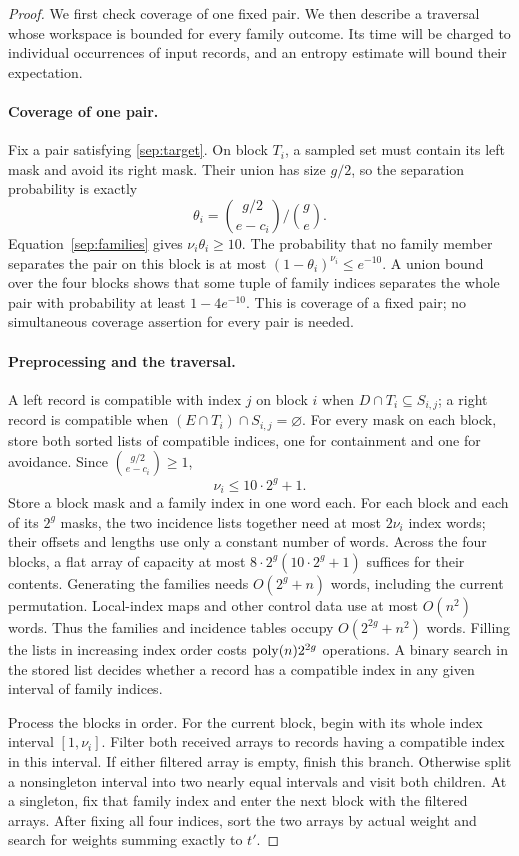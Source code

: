 \begin{proof}
We first check coverage of one fixed pair. We then describe a traversal
whose workspace is bounded for every family outcome. Its time will be
charged to individual occurrences of input records, and an entropy
estimate will bound their expectation.

\paragraph{Coverage of one pair.}
Fix a pair satisfying \eqref{sep:target}. On block $T_i$, a sampled
set must contain its left mask and avoid its right mask. Their union
has size $g/2$, so the separation probability is exactly
\[
 \theta_i=\binom{g/2}{e-c_i}\big/\binom{g}{e}.
\]
Equation~\eqref{sep:families} gives $\nu_i\theta_i\ge10$.
The probability that no family member separates the pair on this
block is at most $(1-\theta_i)^{\nu_i}\le e^{-10}$.
A union bound over the four blocks shows that some tuple of family
indices separates the whole pair with probability at least
$1-4e^{-10}$. This is coverage of a fixed pair; no simultaneous
coverage assertion for every pair is needed.

\paragraph{Preprocessing and the traversal.}
A left record is compatible with index $j$ on block $i$ when
$D\cap T_i\subseteq S_{i,j}$; a right record is compatible when
$(E\cap T_i)\cap S_{i,j}=\varnothing$.
For every mask on each block, store both sorted lists of compatible
indices, one for containment and one for avoidance. Since
$\binom{g/2}{e-c_i}\ge1$,
\[
 \nu_i\le10\cdot2^g+1.
\]
Store a block mask and a family index in one word each. For each block
and each of its $2^g$ masks, the two incidence lists together need at
most $2\nu_i$ index words; their offsets and lengths use only a
constant number of words. Across the four blocks, a flat array of
capacity at most $8\cdot2^g(10\cdot2^g+1)$ suffices for their
contents. Generating the families needs $O(2^g+n)$ words, including
the current permutation. Local-index maps and other control data
use at most $O(n^2)$ words. Thus the families and incidence tables
occupy $O(2^{2g}+n^2)$ words. Filling the lists in increasing index
order costs $\operatorname{poly}(n)2^{2g}$ operations.
A binary search in the stored list decides whether a record has a compatible index in
any given interval of family indices.

Process the blocks in order. For the current block, begin with its
whole index interval $[1,\nu_i]$. Filter both received arrays to
records having a compatible index in this interval. If either filtered
array is empty, finish this branch. Otherwise split a nonsingleton
interval into two nearly equal intervals and visit both children. At
a singleton, fix that family index and enter the next block with the
filtered arrays. After fixing all four indices, sort the two arrays
by actual weight and search for weights summing exactly to $t'$.


\end{proof}
